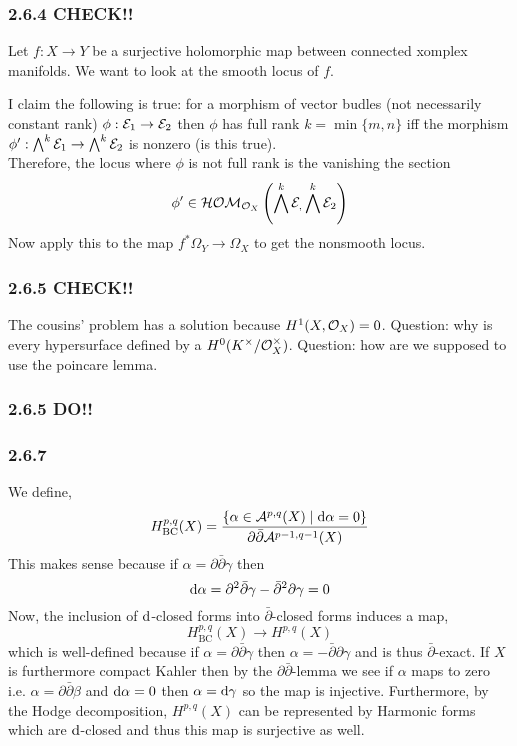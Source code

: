 \documentclass[12pt]{article}
\begin{document}
\subsubsection{2.6.4 CHECK!!}

Let $f : X \to Y$ be a surjective holomorphic map between connected xomplex manifolds. We want to look at the smooth locus of $f$.

I claim the following is true: for a morphism of vector budles (not necessarily constant rank) $\phi : \mathcal{E}_1 \to \mathcal{E}_2$ then $\phi$ has full rank $k = \min{\{m, n \}}$ iff the morphism $\phi' : \bigwedge^k \mathcal{E}_1 \to \bigwedge^k \mathcal{E}_2$ is nonzero (is this true).
\bigskip\\
Therefore, the locus where $\phi$ is not full rank is the vanishing the section
\[ \phi' \in \mathcal{HOM}_{\mathcal{O}_{X}}\left(\bigwedge^k \mathcal{E}_, \bigwedge^k \mathcal{E}_2\right) \]
Now apply this to the map $f^* \Omega_Y \to \Omega_X$ to get the nonsmooth 
locus.

\subsubsection{2.6.5 CHECK!!}

The cousins' problem has a solution because $H^1(X, \mathcal{O}_{X}) = 0$. Question: why is every hypersurface defined by a $H^0(K^\times / \mathcal{O}_{X}^\times)$. Question: how are we supposed to use the poincare lemma.

\subsubsection{2.6.5 DO!!}

\subsubsection{2.6.7}

\renewcommand{\A}{\mathcal{A}}

We define,
\[ H^{p,q}_{\mathrm{BC}}(X) = \frac{\{ \alpha \in \A^{p,q}(X) \mid \d{\alpha} = 0 \}}{ \partial \bar{\partial} \A^{p-1,q-1}(X)} \] 
This makes sense because if $\alpha = \partial \bar{\partial} \gamma$ then \[ \mathrm{d}{\alpha} = \partial^2 \bar{\partial} \gamma - \bar{\partial}^2 \partial \gamma = 0 \]
Now, the inclusion of $\mathrm{d}{}$-closed forms into $\bar{\partial}$-closed forms induces a map,
\[ H^{p,q}_{\mathrm{BC}}(X) \to H^{p,q}(X) \]
which is well-defined because if $\alpha = \partial \bar{\partial} \gamma$ then $\alpha = - \bar{\partial} \partial \gamma$ and is thus $\bar{\partial}$-exact. If $X$ is furthermore compact Kahler then by the $\partial \bar{\partial}$-lemma we see if $\alpha$ maps to zero i.e. $\alpha = \partial \bar{\partial} \beta$ and $\mathrm{d}{\alpha} = 0$ then $\alpha = \mathrm{d}{\gamma}$ so the map is injective. Furthermore, by the Hodge decomposition, $H^{p,q}(X)$ can be represented by Harmonic forms which are $\mathrm{d}$-closed and thus this map is surjective as well.
\end{document}

